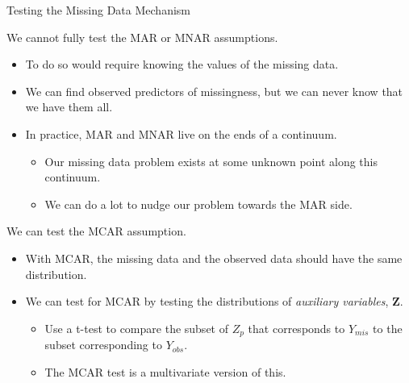 \documentclass{beamer}\usepackage[]{graphicx}\usepackage[]{color}
\begin{document}
\begin{frame}[allowframebreaks]{Testing the Missing Data Mechanism}

  We cannot fully test the MAR or MNAR assumptions.
  \begin{itemize}
  \item To do so would require knowing the values of the missing data.
    \vc
  \item We can find observed predictors of missingness, but we can never know
    that we have them all.
    \vc
  \item In practice, MAR and MNAR live on the ends of a continuum.
    \begin{itemize}
    \item Our missing data problem exists at some unknown point along this
      continuum.
      \vc
    \item We can do a lot to nudge our problem towards the MAR side.
    \end{itemize}
  \end{itemize}

  \pagebreak

  We can test the MCAR assumption.
  \begin{itemize}
  \item With MCAR, the missing data and the observed data should have the same
    distribution.
    \vc
  \item We can test for MCAR by testing the distributions of \emph{auxiliary
    variables}, $\mathbf{Z}$.
    \begin{itemize}
    \item Use a t-test to compare the subset of $Z_p$ that corresponds to
      $Y_{mis}$ to the subset corresponding to $Y_{obs}$.
      \vc
    \item The \citet{little:1988} MCAR test is a multivariate version of this.
    \end{itemize}
  \end{itemize}

\end{frame}

\end{document}
